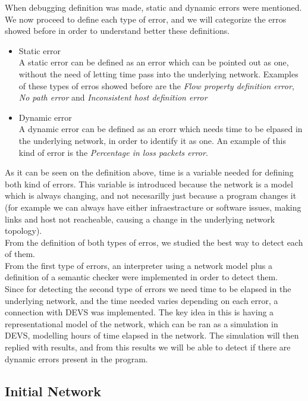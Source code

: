 When debugging definition was made, static and dynamic errors were mentioned. We now proceed to define each type of error, and we will categorize the erros showed before in order to understand better these definitions.

\begin{itemize}

\item Static error\\
A static error can be defined as an error which can be pointed out as one, without the need of letting time pass into the underlying network. Examples of these types of erros showed before are the \textit{Flow property definition error}, \textit{No path error} and \textit{Inconsistent host definition error}

\item Dynamic error\\
A dynamic error can be defined as an erorr which needs time to be elpased in the underlying network, in order to identify it as one. An example of this kind of error is the \textit{Percentage in loss packets error}. 
\end{itemize} 

As it can be seen on the definition above, time is a variable needed for defining both kind of errors. This variable is introduced because the network is a model which is always changing, and not necesarilly just because a program changes it (for example we can always have either infraestracture or software issues, making links and host not reacheable, causing a change in the underlying network topology).\\
From the definition of both types of erros, we studied the best way to detect each of them.\\
From the first type of errors, an interpreter using a network model plus a definition of a semantic checker were implemented in order to detect them.\\ Since for detecting the second type of errors we need time to be elapsed in the underlying network, and the time needed varies depending on each error, a connection with DEVS was implemented. The key idea in this is having a representational model of the network, which can be ran as a simulation in DEVS, modelling hours of time elapsed in the network. The simulation will then replied with results, and from this results we will be able to detect if there are dynamic errors present in the program. 


\subsection{Initial Network}

